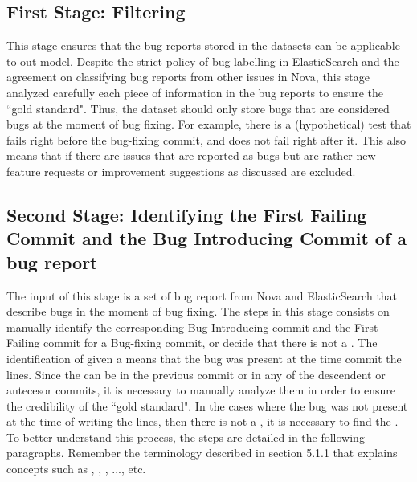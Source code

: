 \documentclass[a4paper, 12pt]{book}
\begin{document}
\subsection{First Stage: Filtering}
\label{sec:methodologyFS}

This stage ensures that the bug reports stored in the datasets can be applicable to out model. Despite the strict policy of bug labelling in ElasticSearch and the agreement on classifying bug reports from other issues in Nova, this stage analyzed carefully each piece of information in the bug reports to ensure the ``gold standard". Thus, the dataset should only store bugs that are considered bugs at the moment of bug fixing. For example, there is a (hypothetical) test that fails right before the bug-fixing commit, and does not fail right after it.  This also means that if there are issues that are reported as bugs but are rather new feature requests or improvement suggestions as discussed are excluded. 

\subsection{Second Stage: Identifying the First Failing Commit and the Bug Introducing Commit of a bug report}
\label{sec:methodologySS}

The input of this stage is a set of bug report from Nova and ElasticSearch that describe bugs in the moment of bug fixing. The steps in this stage consists on manually identify the corresponding Bug-Introducing commit and the First-Failing commit for a Bug-fixing commit, or decide that there is not a \BIC. The identification of \BIC given a \BFC means that the bug was present at the time commit the lines. Since the \BIC can be in the previous commit or in any of the descendent or antecesor commits, it is necessary to manually analyze them in order to ensure the credibility of the ``gold standard". In the cases where the bug was not present at the time of writing the lines, then there is not a \BIC, it is necessary to find the \FFC. To better understand this process, the steps are detailed in the following paragraphs. Remember the terminology described in section 5.1.1 that explains concepts such as \BFC, , ,  ..., etc. 

\end{document}
